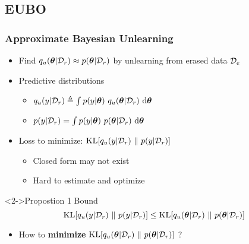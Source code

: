 \documentclass[pdf]{beamer}
\begin{document}
\subsection{EUBO}
\begin{frame}
  \frametitle{Approximate Bayesian Unlearning}
  \begin{itemize}
    \item Find $q_u(\bm{\theta}|\mathcal{D}_r) \approx p(\bm{\theta}|\mathcal{D}_r)$ by unlearning from erased data $\mathcal{D}_e$
    \item Predictive distributions
    \begin{itemize}
      \item $q_u(y|\dc) \triangleq %
      \int p(y|\bm{\theta})\ q_u(\bm{\theta}|\dc)\  \text{d}\bm{\theta}$
      \item $p(y|\dc) = %
      \int p(y|\bm{\theta})\ p(\bm{\theta}|\dc)\  \text{d}\bm{\theta}$
    \end{itemize}
    \item Loss to minimize: $\text{KL}[q_u(y|\mathcal{D}_r)\ \Vert\ p(y|\mathcal{D}_r)]$
    \begin{itemize}
      \item Closed form may not exist
      \item Hard to estimate and optimize
    \end{itemize}
  \end{itemize}
  \begin{block}<2->{Propostion 1 Bound}
    $$\text{KL}[q_u(y|\mathcal{D}_r)\ \Vert\ p(y|\mathcal{D}_r)] \le \text{KL}[q_u(\bm{\theta}|\mathcal{D}_r)\ \Vert\ p(\bm{\theta}|\mathcal{D}_r)]$$
  \end{block}
  \begin{itemize}
    \item<2-> How to \textbf{minimize} $\text{KL}[q_u(\bm{\theta}|\mathcal{D}_r)\ \Vert\ p(\bm{\theta}|\mathcal{D}_r)]$ ?
  \end{itemize}
\end{frame}
\end{document}
